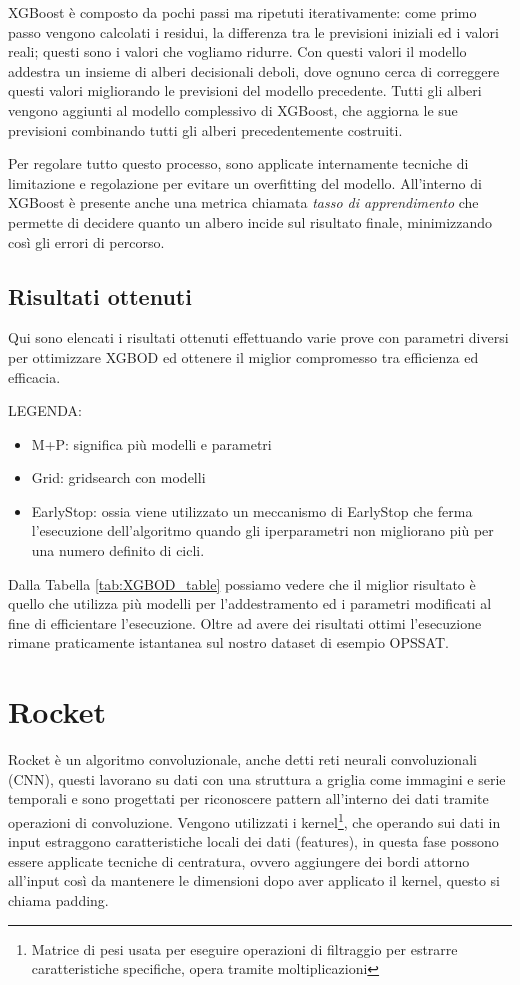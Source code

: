 XGBoost è composto da pochi passi ma ripetuti iterativamente: come primo passo vengono calcolati i residui, la differenza tra le previsioni iniziali ed i valori reali; questi sono i valori che vogliamo ridurre. Con questi valori il modello addestra un insieme di alberi decisionali deboli, dove ognuno cerca di correggere questi valori migliorando le previsioni del modello precedente. Tutti gli alberi vengono aggiunti al modello complessivo di XGBoost, che aggiorna le sue previsioni combinando tutti gli alberi precedentemente costruiti.

Per regolare tutto questo processo, sono applicate internamente tecniche di limitazione e regolazione per evitare un overfitting del modello. All'interno di XGBoost è presente anche una metrica chiamata \textit{tasso di apprendimento} che permette di decidere quanto un albero incide sul risultato finale, minimizzando così gli errori di percorso.

\subsection{Risultati ottenuti}
Qui sono elencati i risultati ottenuti effettuando varie prove con parametri diversi per ottimizzare XGBOD ed ottenere il miglior compromesso tra efficienza ed efficacia.
\pagebreak


LEGENDA:
\begin{itemize}
    \item M+P: significa più modelli e parametri
    \item Grid: gridsearch con modelli
    \item EarlyStop: ossia viene utilizzato un meccanismo di EarlyStop che ferma l'esecuzione dell'algoritmo quando gli iperparametri non migliorano più per una numero definito di cicli.
\end{itemize}

Dalla Tabella \ref{tab:XGBOD_table} possiamo vedere che il miglior risultato è quello che utilizza più modelli per l'addestramento ed i parametri modificati al fine di efficientare l'esecuzione. Oltre ad avere dei risultati ottimi l'esecuzione rimane praticamente istantanea sul nostro dataset di esempio OPS\textunderscore SAT.

\section{Rocket}
Rocket è un algoritmo convoluzionale, anche detti reti neurali convoluzionali (CNN), questi lavorano su dati con una struttura a griglia come immagini e serie temporali e sono progettati per riconoscere pattern all'interno dei dati tramite operazioni di convoluzione.
Vengono utilizzati i kernel\footnote{Matrice di pesi usata per eseguire operazioni di filtraggio per estrarre caratteristiche specifiche, opera tramite moltiplicazioni}, che operando sui dati in input estraggono caratteristiche locali dei dati (features), in questa fase possono essere applicate tecniche di centratura, ovvero aggiungere dei bordi attorno all'input così da mantenere le dimensioni dopo aver applicato il kernel, questo si chiama padding.

